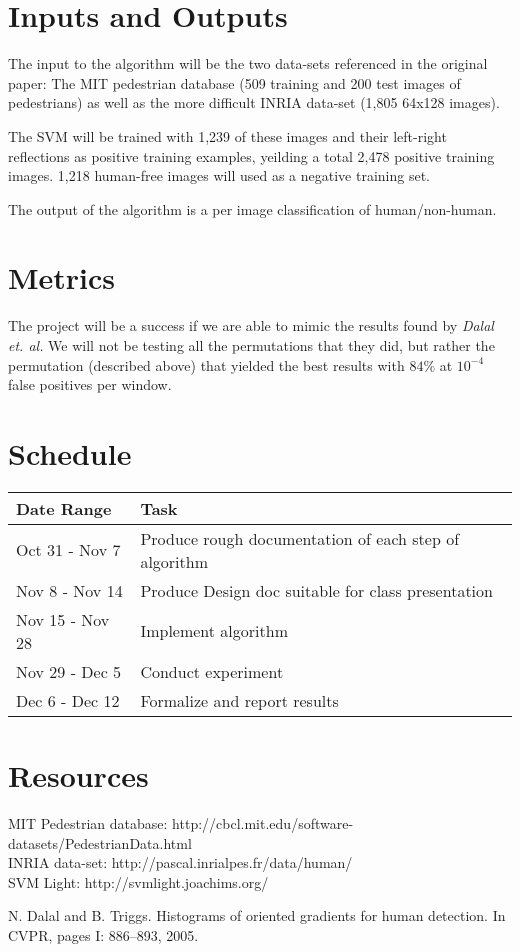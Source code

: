 \documentclass[a4paper,11pt]{article}
\begin{document}
\section{Inputs and Outputs}
The input to the algorithm will be the two data-sets referenced in the original paper: 
The MIT pedestrian database (509 training and 200 test images of pedestrians) as well 
as the more difficult INRIA data-set (1,805 64x128 images).

The SVM will be trained with 1,239 of these images and their left-right reflections as positive training examples,
yeilding a total 2,478 positive training images. 1,218 human-free images will used as a negative training set.

The output of the algorithm is a per image classification of human/non-human.

\section{Metrics} %
The project will be a success if we are able to mimic the results found by \emph{Dalal et. al.} 
We will not be testing all the permutations that they did, but rather the permutation 
(described above) that yielded the best results with $84\%$ at $10^{-4}$ false positives per window.

\section{Schedule} %
\begin{tabular}{|l|l|}
\hline
Date Range & Task \\
\hline
Oct 31 - Nov  7 & Produce rough documentation of each step of algorithm \\
Nov  8 - Nov 14 & Produce Design doc suitable for class presentation \\
Nov 15 - Nov 28 & Implement algorithm \\
Nov 29 - Dec  5 & Conduct experiment \\
Dec  6 - Dec 12 & Formalize and report results \\
\hline
\end{tabular}

\section{Resources} %
MIT Pedestrian database: http://cbcl.mit.edu/software-datasets/PedestrianData.html \\
INRIA data-set: http://pascal.inrialpes.fr/data/human/ \\
SVM Light: http://svmlight.joachims.org/ \\

\begin{thebibliography}{1}

   N. Dalal and B. Triggs. Histograms of oriented gradients for human detection. 
  In CVPR, pages I: 886–893, 2005.

\end{thebibliography}
\end{document}
